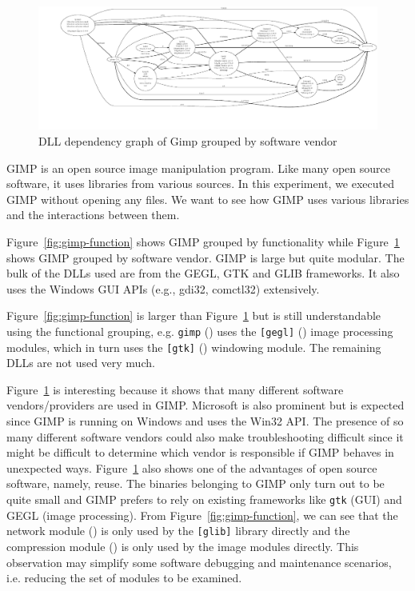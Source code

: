 \begin{figure}
\includegraphics[width=1.0\textwidth]{depvis/gimp-vendor.pdf}
\caption{DLL dependency graph of Gimp grouped by software vendor}
\label{fig:gimp-vendor}
\end{figure}

GIMP is an open source image manipulation program. Like many open source
software, it uses libraries from various sources. In this experiment, we
executed GIMP without opening any files. We want to see how GIMP uses various
libraries and the interactions between them.

Figure~\ref{fig:gimp-function} shows GIMP grouped by functionality while
Figure~\ref{fig:gimp-vendor} shows
GIMP grouped by software vendor.
GIMP is large but quite modular. The bulk of
the DLLs used are from the GEGL, GTK and GLIB frameworks. It also uses the
Windows GUI APIs (e.g., gdi32, comctl32) extensively.

Figure~\ref{fig:gimp-function} is larger than Figure~\ref{fig:gimp-vendor}
but is still understandable using the functional grouping,
e.g. {\tt gimp} () uses
the {\tt [gegl]} () image processing modules,
which in turn uses the {\tt [gtk]} () windowing
module.
The remaining DLLs are not used very much.

Figure~\ref{fig:gimp-vendor} is interesting because it shows that
many different software vendors/providers are used in GIMP.
Microsoft is also prominent but is
expected since GIMP is running on Windows and uses the Win32 API.
The presence of so many different software vendors could also make
troubleshooting difficult since it might be difficult to determine
which vendor is responsible if GIMP behaves in unexpected ways.
Figure~\ref{fig:gimp-vendor} also shows
one of the advantages of open source software, namely, reuse. The
binaries belonging to GIMP only turn out to be quite small and
GIMP prefers to rely on
existing frameworks like {\tt gtk} (GUI) and GEGL (image processing).
 From Figure~\ref{fig:gimp-function}, we can see that the network module
() is only used by the {\tt [glib]} library directly
and the compression module () is only used by
the image modules directly.
This observation may simplify some software debugging and maintenance
scenarios, i.e. reducing the set of modules to be examined.

